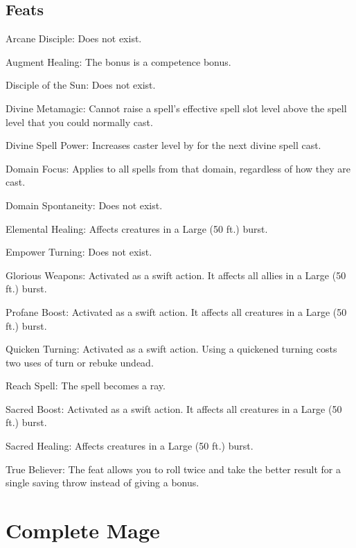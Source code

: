 \subsection{Feats}
\begin{itemize*}
\item Arcane Disciple: Does not exist.
\item Augment Healing: The bonus is a competence bonus.
\item Disciple of the Sun: Does not exist.
\item Divine Metamagic: Cannot raise a spell's effective spell slot level above the spell level that you could normally cast.
\item Divine Spell Power: Increases caster level by  for the next divine spell cast.
\item Domain Focus: Applies to all spells from that domain, regardless of how they are cast.
\item Domain Spontaneity: Does not exist.
\item Elemental Healing: Affects creatures in a Large (50 ft.) burst.
\item Empower Turning: Does not exist.
\item Glorious Weapons: Activated as a swift action. It affects all allies in a Large (50 ft.) burst.
\item Profane Boost: Activated as a swift action. It affects all creatures in a Large (50 ft.) burst.
\item Quicken Turning: Activated as a swift action. Using a quickened turning costs two uses of turn or rebuke undead.
\item Reach Spell: The spell becomes a ray.
\item Sacred Boost: Activated as a swift action. It affects all creatures in a Large (50 ft.) burst.
\item Sacred Healing: Affects creatures in a Large (50 ft.) burst.
\item True Believer: The feat allows you to roll twice and take the better result for a single saving throw instead of giving a bonus.
\end{itemize*}

\section{Complete Mage}
